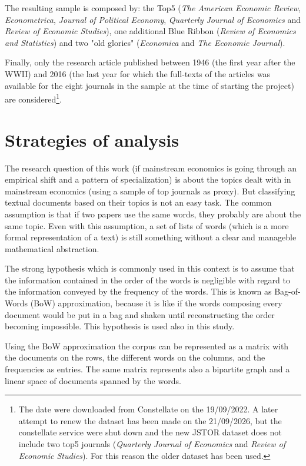 \documentclass[a4paper, 11pt, headings=standardclasses, tablecaptionsbelow]{scrartcl}
\begin{document}
The resulting sample is composed by: the Top5 (\textit{The American Economic Review}, \textit{Econometrica}, \textit{Journal of Political Economy}, \textit{Quarterly Journal of Economics} and \textit{Review of Economic Studies}), one additional Blue Ribbon (\textit{Review of Economics and Statistics}) and two "old glories" (\textit{Economica} and \textit{The Economic Journal}).

Finally, only the research article published between 1946 (the first year after the WWII) and 2016 (the last year for which the full-texts of the articles was available for the eight journals in the sample at the time of starting the project) are considered\footnote{The date were downloaded from Constellate on the 19/09/2022. A later attempt to renew the dataset has been made on the 21/09/2026, but the constellate service were shut down and the new JSTOR dataset does not include two top5 journals (\textit{Quarterly Journal of Economics} and \textit{Review of Economic Studies}). For this reason the older dataset has been used.}.

\section{Strategies of analysis}
The research question of this work (if mainstream economics is going through an empirical shift and a pattern of specialization) is about the topics dealt with in mainstream economics (using a sample of top journals as proxy).
But classifying textual documents based on their topics is not an easy task. The common assumption is that if two papers use the same words, they probably are about the same topic. Even with this assumption, a set of lists of words (which is a more formal representation of a text) is still something without a clear and manageble mathematical abstraction.

The strong hypothesis which is commonly used in this context is to assume that the information contained in the order of the words is negligible with regard to the information conveyed by the frequency of the words.
This is known as Bag-of-Words (BoW) approximation, because it is like if the words composing every document would be put in a bag and shaken until reconstructing the order becoming impossible. This hypothesis is used also in this study. %

Using the BoW approximation the corpus can be represented as a matrix with the documents on the rows, the different words on the columns, and the frequencies as entries. The same matrix represents also a bipartite graph and a linear space of documents spanned by the words.
\end{document}
